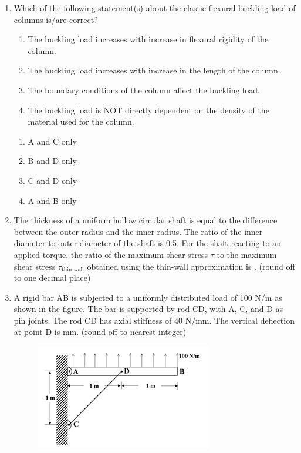 \documentclass{article}
\begin{document}
\begin{enumerate}[leftmargin=*, resume]
\item Which of the following statement(s) about the elastic flexural buckling load of columns is/are correct?
\begin{enumerate}
\item The buckling load increases with increase in flexural rigidity of the column.
\item The buckling load increases with increase in the length of the column.
\item The boundary conditions of the column affect the buckling load.
\item The buckling load is NOT directly dependent on the density of the material used for the column.
\end{enumerate}
\begin{multicols}{4}
\begin{enumerate}
\item A and C only
\item B and D only
\item C and D only
\item A and B only
\end{enumerate}
\end{multicols}

\item The thickness of a uniform hollow circular shaft is equal to the difference between the outer radius and the inner radius. The ratio of the inner diameter to outer diameter of the shaft is 0.5. For the shaft reacting to an applied torque, the ratio of the maximum shear stress $\tau$ to the maximum shear stress $\tau_{\text{thin-wall}}$ obtained using the thin-wall approximation is \underline{\hspace{1.5cm}}. (round off to one decimal place)

\item A rigid bar AB is subjected to a uniformly distributed load of 100 N/m as shown in the figure. The bar is supported by rod CD, with A, C, and D as pin joints. The rod CD has axial stiffness of 40 N/mm. The vertical deflection at point D is \underline{\hspace{1.5cm}} mm. (round off to nearest integer)
\begin{figure}[H]
    \centering
    \includegraphics[width=0.3\linewidth]{figs/q49.png}
    \caption{}
    \label{fig:q49}
\end{figure}


\end{enumerate}
\end{document}
